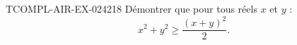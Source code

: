 \begin{exercice}{TCOMPL-AIR-EX-024}{2}{18}
Démontrer que pour tous réels $x$ et $y$ :
\[ x^2 + y^2 \geq \frac{(x+y)^2}{2}. \]

\end{exercice}
